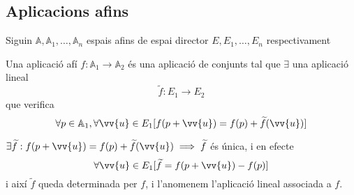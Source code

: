 \subsection{Aplicacions afins}
\label{ss_aplafi}

Siguin $\mathbb{A},\mathbb{A}_1,\dotsc ,\mathbb{A}_n$ espais afins de espai director $E,E_1,\dotsc ,E_n$ respectivament

\begin{defn}
	Una aplicació afí $f:\mathbb{A}_1\to\mathbb{A}_2$ és una aplicació de conjunts tal que $\exists$ una aplicació lineal
	\[\widetilde{f}:E_1\to E_2\]
	que verifica
	\[\forall p\in\mathbb{A}_1,\forall\vv{u}\in E_1[f(p+\vv{u})=f(p)+\widetilde{f}(\vv{u})]\]
\end{defn}

\begin{prop}
	$\exists\widetilde{f}:f(p+\vv{u})=f(p)+\widetilde{f}(\vv{u})\implies\widetilde{f}$ és única, i en efecte
	\[\forall\vv{u}\in E_1[\widetilde{f}=f(p+\vv{u})-f(p)]\]
	i així $\widetilde{f}$ queda determinada per $f$, i l'anomenem l'aplicació lineal associada a $f$.
\end{prop}

